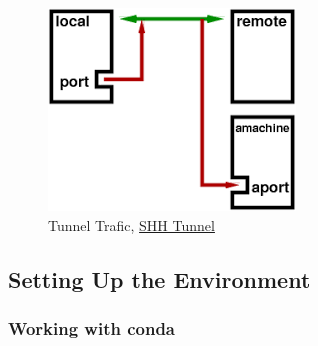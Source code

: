 \begin{figure}[H]
	\centering
	\includegraphics[scale = 0.3]{attachment/chapter_AML/Scc010}
	\caption{Tunnel Trafic, \href{https://radcamp.github.io/AF-Biota/Jupyter_Notebook_Setup.html}{SHH Tunnel}}
\end{figure}

\subsection{Setting Up the Environment}

\subsubsection{Working with conda}
